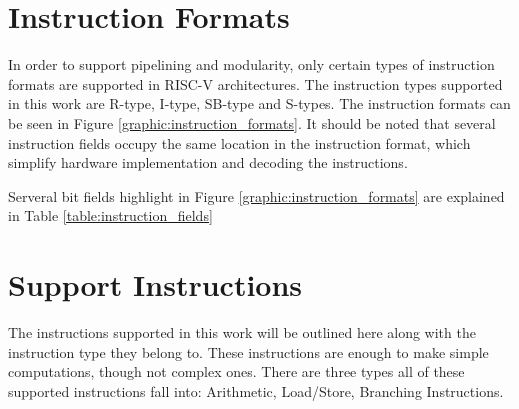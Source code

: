 \section{Instruction Formats}
In order to support pipelining and modularity, only certain types of instruction formats are
supported in RISC-V architectures. The instruction types supported in this work are R-type, I-type, SB-type and S-types.
The instruction formats can be seen in Figure \ref{graphic:instruction_formats}. It should be noted that several
instruction fields occupy the same location in the instruction format, which simplify hardware implementation and decoding
the instructions.


Serveral bit fields highlight in Figure \ref{graphic:instruction_formats} are explained in Table \ref{table:instruction_fields}

\begin{table}[!h]
    \centering
    \caption{Instruction Fields Definition}
    \label{table:instruction_fields}
    
\end{table}
\section{Support Instructions}
The instructions supported in this work will be outlined here along with the instruction type they belong to.
These instructions are enough to make simple computations, though not complex ones. There are three types all of these
supported instructions fall into: Arithmetic, Load/Store, Branching Instructions.

